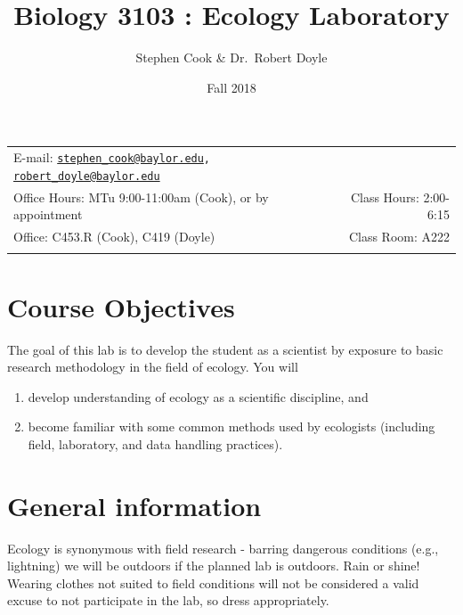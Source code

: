 \documentclass[11pt,]{article}
\title{Biology 3103 : Ecology Laboratory}
\author{Stephen Cook \& Dr.~Robert Doyle}
\date{Fall 2018}
\begin{document}
  

		\maketitle
		
	
		\thispagestyle{firststyle}



	\noindent \begin{tabular*}{\textwidth}{ @{\extracolsep{\fill}} lr @{\extracolsep{\fill}}}


E-mail: \texttt{\href{mailto:stephen_cook@baylor.edu}{\nolinkurl{stephen\_cook@baylor.edu}},
\href{mailto:robert_doyle@baylor.edu}{\nolinkurl{robert\_doyle@baylor.edu}}} \\
Office Hours: MTu 9:00-11:00am (Cook), or by appointment  &  Class Hours: 2:00-6:15\\
Office: C453.R (Cook), C419 (Doyle)  & Class Room: A222\\
	&  \\
	\hline
	\end{tabular*}
	
\vspace{2mm}
	


\section{Course Objectives}\label{course-objectives}

The goal of this lab is to develop the student as a scientist by
exposure to basic research methodology in the field of ecology. You will

\begin{enumerate}
\def\labelenumi{\arabic{enumi}.}
\item
  develop understanding of ecology as a scientific discipline, and
\item
  become familiar with some common methods used by ecologists (including
  field, laboratory, and data handling practices).
\end{enumerate}

\section{General information}\label{general-information}

Ecology is synonymous with field research - barring dangerous conditions
(e.g., lightning) we will be outdoors if the planned lab is outdoors.
Rain or shine! Wearing clothes not suited to field conditions will not
be considered a valid excuse to not participate in the lab, so dress
appropriately.
\end{document}

